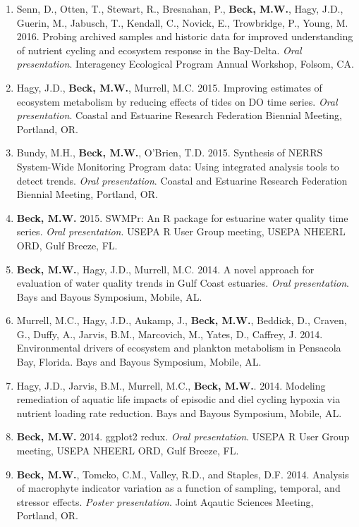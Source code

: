 \documentclass[letterpaper,12pt]{article}
\begin{document}
\begin{enumerate}
\item Senn, D., Otten, T., Stewart, R., Bresnahan, P., {\bf Beck, M.W.}, Hagy, J.D., Guerin, M., Jabusch, T., Kendall, C., Novick, E., Trowbridge, P., Young, M. 2016. Probing archived samples and historic data for improved understanding of nutrient cycling and ecosystem response in the Bay-Delta. \textit{Oral presentation}. Interagency Ecological Program Annual Workshop, Folsom, CA.

\item Hagy, J.D., {\bf Beck, M.W.}, Murrell, M.C. 2015. Improving estimates of ecosystem metabolism by reducing effects of tides on DO time series. \textit{Oral presentation}. Coastal and Estuarine Research Federation Biennial Meeting, Portland, OR. 

\item Bundy, M.H., {\bf Beck, M.W.}, O'Brien, T.D. 2015. Synthesis of NERRS System-Wide Monitoring Program data: Using integrated analysis tools to detect trends. \textit{Oral presentation}. Coastal and Estuarine Research Federation Biennial Meeting, Portland, OR.

\item {\bf Beck, M.W.} 2015. SWMPr: An R package for estuarine water quality time series. \textit{Oral presentation}. USEPA R User Group meeting, USEPA NHEERL ORD, Gulf Breeze, FL.

\item {\bf Beck, M.W.}, Hagy, J.D., Murrell, M.C. 2014. A novel approach for evaluation of water quality trends in Gulf Coast estuaries. \textit{Oral presentation}. Bays and Bayous Symposium, Mobile, AL.

\item Murrell, M.C., Hagy, J.D., Aukamp, J., {\bf Beck, M.W.}, Beddick, D., Craven, G., Duffy, A., Jarvis, B.M., Marcovich, M., Yates, D., Caffrey, J. 2014. Environmental drivers of ecosystem and plankton metabolism in Pensacola Bay, Florida. Bays and Bayous Symposium, Mobile, AL. 

\item Hagy, J.D., Jarvis, B.M., Murrell, M.C., {\bf Beck, M.W.}. 2014. Modeling remediation of aquatic life impacts of episodic and diel cycling hypoxia via nutrient loading rate reduction. Bays and Bayous Symposium, Mobile, AL. 

\item {\bf Beck, M.W.} 2014. ggplot2 redux. \textit{Oral presentation}. USEPA R User Group meeting, USEPA NHEERL ORD, Gulf Breeze, FL.

\item {\bf Beck, M.W.}, Tomcko, C.M., Valley, R.D., and Staples, D.F. 2014. Analysis of macrophyte indicator variation as a function of sampling, temporal, and stressor effects. \textit{Poster presentation}. Joint Aqautic Sciences Meeting, Portland, OR.


\end{enumerate}
\end{document}
